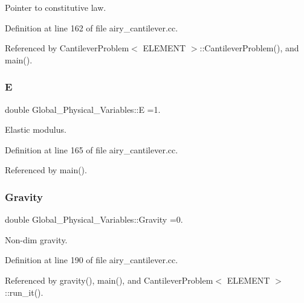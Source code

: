 Pointer to constitutive law. 



Definition at line 162 of file airy\+\_\+cantilever.\+cc.



Referenced by Cantilever\+Problem$<$ E\+L\+E\+M\+E\+N\+T $>$\+::\+Cantilever\+Problem(), and main().

\mbox{\label{namespaceGlobal__Physical__Variables_a09a019474b7405b35da2437f7779bc7e}} 
\subsubsection{\texorpdfstring{E}{E}}
{\footnotesize\ttfamily double Global\+\_\+\+Physical\+\_\+\+Variables\+::E =1.}



Elastic modulus. 



Definition at line 165 of file airy\+\_\+cantilever.\+cc.



Referenced by main().

\mbox{\label{namespaceGlobal__Physical__Variables_a8b80d3e8d63b8d0a0ed435a2dd7fe2ad}} 
\subsubsection{\texorpdfstring{Gravity}{Gravity}}
{\footnotesize\ttfamily double Global\+\_\+\+Physical\+\_\+\+Variables\+::\+Gravity =0.}



Non-\/dim gravity. 



Definition at line 190 of file airy\+\_\+cantilever.\+cc.



Referenced by gravity(), main(), and Cantilever\+Problem$<$ E\+L\+E\+M\+E\+N\+T $>$\+::run\+\_\+it().

\mbox{\label{namespaceGlobal__Physical__Variables_af6e07423e22c0991084d9a2f43727805}} 
